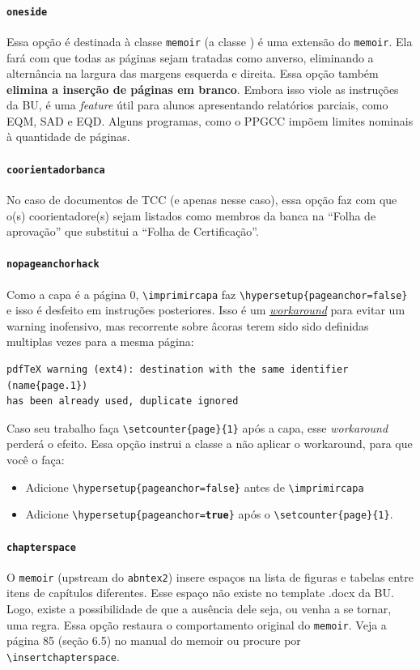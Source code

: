 \documentclass[embeddedlogo]{ufsc-thesis-rn46-2019}
\newcommand{\lacmd}[1]{\texttt{\textbackslash{}#1}}
\begin{document}
\paragraph*{\texttt{oneside}} Essa opção é destinada à classe \texttt{memoir} (a
classe \abnTeX) é uma extensão do \texttt{memoir}. Ela fará com que todas as
páginas sejam tratadas como anverso, eliminando a alternância na largura das
margens esquerda e direita. Essa opção também \textbf{elimina a inserção de
  páginas em branco}. Embora isso viole as instruções da BU, é uma \emph{feature} útil
para alunos apresentando relatórios parciais, como EQM, SAD e EQD. Alguns
programas, como o PPGCC impõem limites nominais à quantidade de páginas.

\paragraph*{\texttt{coorientadorbanca}}
No caso de documentos de TCC (e apenas nesse caso), essa opção faz com que o(s)
coorientadore(s) sejam listados como membros da banca na ``Folha de aprovação''
que substitui a ``Folha de Certificação''. 

\paragraph*{\texttt{nopageanchorhack}}
Como a capa é a página 0, \lacmd{imprimircapa} faz
\lacmd{hypersetup\{pageanchor=false\}} e isso é desfeito em instruções
posteriores. Isso é um
\href{https://tex.stackexchange.com/a/331766}{\emph{workaround}} para evitar um
warning inofensivo, mas recorrente sobre âcoras terem sido sido definidas
multiplas vezes para a mesma página:
\begin{verbatim}
pdfTeX warning (ext4): destination with the same identifier (name{page.1})
has been already used, duplicate ignored
\end{verbatim}
Caso seu trabalho faça \lacmd{setcounter\{page\}\{1\}} após a capa, esse
\emph{workaround} perderá o efeito. Essa opção instrui a classe a não aplicar o
workaround, para que você o faça:
\begin{itemize}
\item Adicione \lacmd{hypersetup\{pageanchor=false\}} antes de \lacmd{imprimircapa}
\item Adicione \lacmd{hypersetup\{pageanchor=\textbf{true}\}} após o
      \lacmd{setcounter\{page\}\{1\}}.
\end{itemize}

\paragraph*{\texttt{chapterspace}}
O \texttt{memoir} (upstream do \texttt{abntex2}) insere espaços na lista de
figuras e tabelas entre itens de capítulos diferentes. Esse espaço não existe no
template .docx da BU. Logo, existe a possibilidade de que a ausência dele seja,
ou venha a se tornar, uma regra. Essa opção restaura o comportamento original do
\texttt{memoir}. Veja a página 85 (seção 6.5) no manual do memoir ou procure por
\lacmd{insertchapterspace}.
\end{document}
